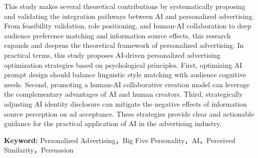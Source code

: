 This study makes several theoretical contributions by systematically proposing and validating the integration pathways between AI and personalized advertising. From feasibility validation, role positioning, and human-AI collaboration to deep audience preference matching and information source effects, this research expands and deepens the theoretical framework of personalized advertising. In practical terms, this study proposes AI-driven personalized advertising optimization strategies based on psychological principles. First, optimizing AI prompt design should balance linguistic style matching with audience cognitive needs. Second, promoting a human-AI collaborative creation model can leverage the complementary advantages of AI and human creators. Third, strategically adjusting AI identity disclosure can mitigate the negative effects of information source perception on ad acceptance. These strategies provide clear and actionable guidance for the practical application of AI in the advertising industry.

\vspace{1cm}

\textbf{Keyword:} Personalized Advertising，Big Five Personality，AI，Perceived Similarity，Persuasion

\clearpage
\pagestyle{empty}
\thispagestyle{empty}
